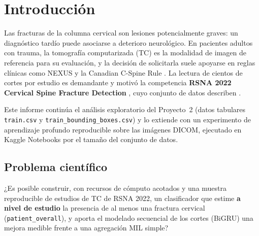\section{Introducci\'on}
Las fracturas de la columna cervical son lesiones potencialmente graves: un diagn\'ostico tard\'io puede asociarse a deterioro neurol\'ogico. En pacientes adultos con trauma, la tomograf\'ia computarizada (TC) es la modalidad de imagen de referencia para su evaluaci\'on, y la decisi\'on de solicitarla suele apoyarse en reglas cl\'inicas como NEXUS \citep{hoffman2000nexus} y la Canadian C-Spine Rule \citep{stiell2001ccr}. La lectura de cientos de cortes por estudio es demandante y motiv\'o la competencia \textbf{RSNA 2022 Cervical Spine Fracture Detection} \citep{rsna2022kaggle}, cuyo conjunto de datos describen \citet{lin2023rsna}.

Este informe contin\'ua el an\'alisis exploratorio del Proyecto~2 (datos tabulares \texttt{train.csv} y \texttt{train\_bounding\_boxes.csv}) y lo extiende con un experimento de aprendizaje profundo reproducible sobre las im\'agenes DICOM, ejecutado en Kaggle Notebooks por el tama\~no del conjunto de datos.

\subsection{Problema cient\'ifico}
¿Es posible construir, con recursos de c\'omputo acotados y una muestra reproducible de estudios de TC de RSNA 2022, un clasificador que estime \textbf{a nivel de estudio} la presencia de al menos una fractura cervical (\texttt{patient\_overall}), y aporta el modelado secuencial de los cortes (BiGRU) una mejora medible frente a una agregaci\'on MIL simple?
